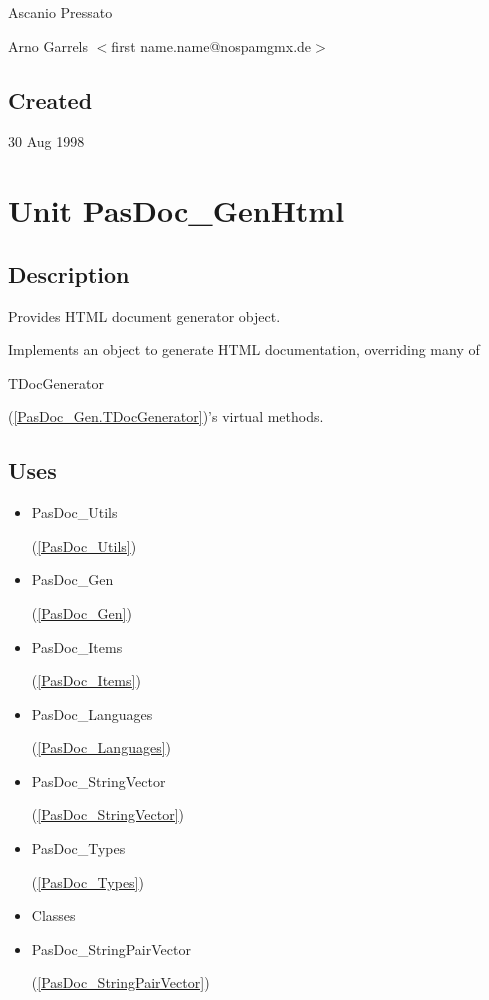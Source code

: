 \documentclass{report}
\begin{document}
\par
Ascanio Pressato

\par
Arno Garrels {$<$}first name.name@nospamgmx.de{$>$}

\section{Created}
\par
30 Aug 1998


\chapter{Unit PasDoc{\_}GenHtml}
\label{PasDoc_GenHtml}
\section{Description}
Provides HTML document generator object.\hfill\vspace*{1ex}

              

Implements an object to generate HTML documentation, overriding many of \begin{ttfamily}TDocGenerator\end{ttfamily}(\ref{PasDoc_Gen.TDocGenerator})'s virtual methods.
\section{Uses}
\begin{itemize}
\item \begin{ttfamily}PasDoc{\_}Utils\end{ttfamily}(\ref{PasDoc_Utils})\item \begin{ttfamily}PasDoc{\_}Gen\end{ttfamily}(\ref{PasDoc_Gen})\item \begin{ttfamily}PasDoc{\_}Items\end{ttfamily}(\ref{PasDoc_Items})\item \begin{ttfamily}PasDoc{\_}Languages\end{ttfamily}(\ref{PasDoc_Languages})\item \begin{ttfamily}PasDoc{\_}StringVector\end{ttfamily}(\ref{PasDoc_StringVector})\item \begin{ttfamily}PasDoc{\_}Types\end{ttfamily}(\ref{PasDoc_Types})\item \begin{ttfamily}Classes\end{ttfamily}\item \begin{ttfamily}PasDoc{\_}StringPairVector\end{ttfamily}(\ref{PasDoc_StringPairVector})\end{itemize}
\end{document}
